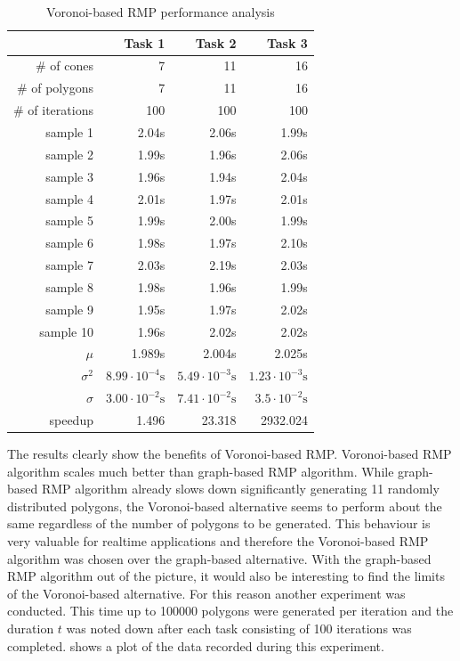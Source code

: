 \documentclass[11pt,a4paper,twoside,openright]{report}
\begin{document}
\begin{table}[h]
\centering
\caption{Voronoi-based RMP performance analysis}
\label{tab:voronoiperformanceanalysis}
\begin{tabular}{|r|r|r|r|}
\hline
 & Task 1 & Task 2 & Task 3 \\ \hline
\# of cones & 7 & 11 & 16 \\ \hline
\# of polygons & 7 & 11 & 16 \\ \hline
\# of iterations & 100 & 100 & 100 \\ \hline
sample 1 & 2.04s & 2.06s & 1.99s \\ \hline
sample 2 & 1.99s & 1.96s & 2.06s \\ \hline
sample 3 & 1.96s & 1.94s & 2.04s \\ \hline
sample 4 & 2.01s & 1.97s & 2.01s \\ \hline
sample 5 & 1.99s & 2.00s & 1.99s \\ \hline
sample 6 & 1.98s & 1.97s & 2.10s \\ \hline
sample 7 & 2.03s & 2.19s & 2.03s \\ \hline
sample 8 & 1.98s & 1.96s & 1.99s \\ \hline
sample 9 & 1.95s & 1.97s & 2.02s \\ \hline
sample 10 & 1.96s & 2.02s & 2.02s \\ \hline
$\mu$ & 1.989s & 2.004s & 2.025s \\ \hline
$\sigma^2$ & $8.99 \cdot 10^{-4}\textrm{s}$ & $5.49 \cdot 10^{-3}\textrm{s} $ & $1.23 \cdot 10^{-3}\textrm{s}$ \\ \hline
$\sigma$ & $3.00 \cdot 10^{-2}\textrm{s}$ & $7.41 \cdot 10^{-2}\textrm{s}$ & $3.5 \cdot 10^{-2}\textrm{s}$ \\ \hline
speedup & 1.496 & 23.318 & 2932.024 \\ \hline
\end{tabular}
\end{table}
The results clearly show the benefits of Voronoi-based RMP. Voronoi-based RMP algorithm scales much better than graph-based RMP algorithm. While graph-based RMP algorithm already slows down significantly generating 11 randomly distributed polygons, the Voronoi-based alternative seems to perform about the same regardless of the number of polygons to be generated. This behaviour is very valuable for realtime applications and therefore the Voronoi-based RMP algorithm was chosen over the graph-based alternative. With the graph-based RMP algorithm out of the picture, it would also be interesting to find the limits of the Voronoi-based alternative. For this reason another experiment was conducted. This time up to 100000 polygons were generated per iteration and the duration $t$ was noted down after each task consisting of 100 iterations was completed.  shows a plot of the data recorded during this experiment.
\end{document}
